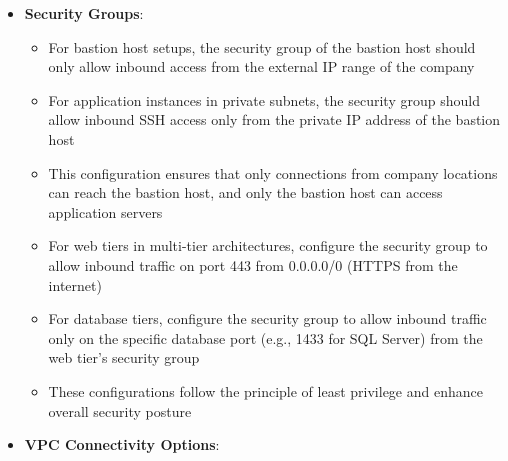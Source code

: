 \documentclass[11pt,a4paper]{report}
\begin{document}
\begin{itemize}
\begin{itemize}
  \item This design ensures that if one AZ becomes unavailable, instances in other AZs can still access the internet
  \item Using NAT gateways is preferred over NAT instances as they're managed services that automatically scale and are more fault-tolerant
  \item NAT instances require more management and manual intervention for high availability and scaling
  \item A VPC can only have one internet gateway attached at any time
  \item Egress-only internet gateways are specifically designed for outbound-only IPv6 traffic, not for IPv4 traffic
  \item For multi-AZ redundancy, it's recommended to create NAT gateways in each public subnet and configure private subnet route tables to forward traffic to the NAT gateway in the same AZ
  \item This approach maintains high availability by ensuring if one AZ becomes unavailable, the other AZs can still provide internet access for EC2 instances
\end{itemize}
  \item \textbf{Security Groups}:
\begin{itemize}
  \item For bastion host setups, the security group of the bastion host should only allow inbound access from the external IP range of the company
  \item For application instances in private subnets, the security group should allow inbound SSH access only from the private IP address of the bastion host
  \item This configuration ensures that only connections from company locations can reach the bastion host, and only the bastion host can access application servers
  \item For web tiers in multi-tier architectures, configure the security group to allow inbound traffic on port 443 from 0.0.0.0/0 (HTTPS from the internet)
  \item For database tiers, configure the security group to allow inbound traffic only on the specific database port (e.g., 1433 for SQL Server) from the web tier's security group
  \item These configurations follow the principle of least privilege and enhance overall security posture
\end{itemize}
  \item \textbf{VPC Connectivity Options}:

\end{itemize}
\end{document}
